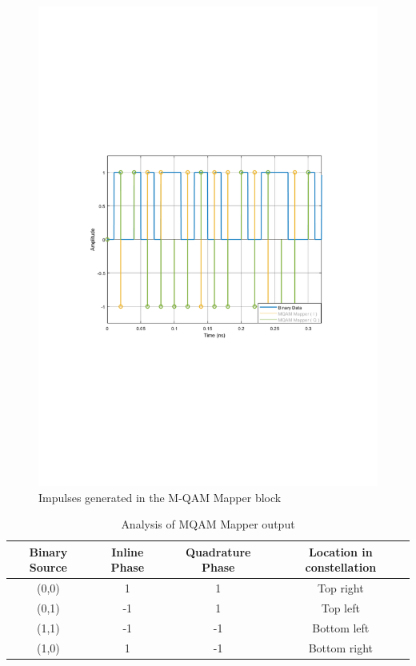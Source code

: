 \begin{figure}[h]
	\centering
    \includegraphics[clip, trim=0.5cm 9cm 0.5cm 9cm, width=\textwidth]{./lib/m_qam_transmitter/figures/TransmitterMapper.pdf}
    \caption{Impulses generated in the M-QAM Mapper block}\label{TransmitterMapper}
\end{figure}

\begin{table}[h]
\begin{center}
	\begin{tabular}{| c | c | c | c | }
		\hline
		\textbf{Binary Source} & \textbf{Inline Phase} & \textbf{Quadrature Phase} & \textbf{Location in constellation} \\ \hline
        (0,0) & 1 & 1 & Top right \\ \hline
        (0,1) & -1 & 1 & Top left \\ \hline
        (1,1) & -1 & -1 & Bottom left \\ \hline
        (1,0) & 1 & -1 & Bottom right \\ \hline
	\end{tabular}
	\caption{Analysis of MQAM Mapper output} \label{MapperTable}
\end{center}
\end{table}


